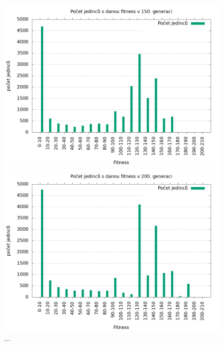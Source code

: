 \begin{figure}[h]
    \begin{minipage}[c]{0.48\linewidth}
        \includegraphics[width=\linewidth]{obrazky/trojnozka_primka_fitnessHistogram150.png}
        \caption{...}
    \end{minipage}
    \hfill
    \begin{minipage}[c]{0.48\linewidth}
        \includegraphics[width=\linewidth]{obrazky/trojnozka_primka_fitnessHistogram200.png}
        \caption{...}
    \end{minipage}
\end{figure}

\clearpage

